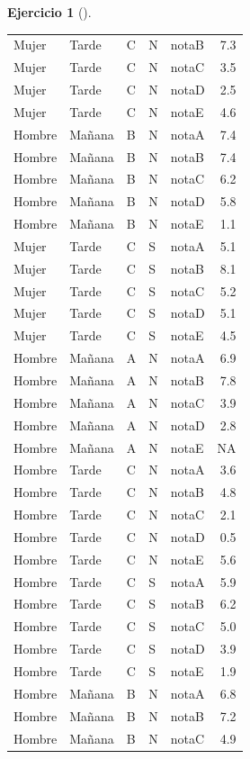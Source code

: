 \documentclass[
  a4paper,
]{scrreport}
\theoremstyle{definition}
\newtheorem{exercise}{Ejercicio}[chapter]
\theoremstyle{remark}
\begin{document}
\begin{exercise}[]
\begin{enumerate}
\begin{tcolorbox}
\begin{longtable}[]{@{}lllllr@{}}
  Mujer & Tarde & C & N & notaB & 7.3 \\
  Mujer & Tarde & C & N & notaC & 3.5 \\
  Mujer & Tarde & C & N & notaD & 2.5 \\
  Mujer & Tarde & C & N & notaE & 4.6 \\
  Hombre & Mañana & B & N & notaA & 7.4 \\
  Hombre & Mañana & B & N & notaB & 7.4 \\
  Hombre & Mañana & B & N & notaC & 6.2 \\
  Hombre & Mañana & B & N & notaD & 5.8 \\
  Hombre & Mañana & B & N & notaE & 1.1 \\
  Mujer & Tarde & C & S & notaA & 5.1 \\
  Mujer & Tarde & C & S & notaB & 8.1 \\
  Mujer & Tarde & C & S & notaC & 5.2 \\
  Mujer & Tarde & C & S & notaD & 5.1 \\
  Mujer & Tarde & C & S & notaE & 4.5 \\
  Hombre & Mañana & A & N & notaA & 6.9 \\
  Hombre & Mañana & A & N & notaB & 7.8 \\
  Hombre & Mañana & A & N & notaC & 3.9 \\
  Hombre & Mañana & A & N & notaD & 2.8 \\
  Hombre & Mañana & A & N & notaE & NA \\
  Hombre & Tarde & C & N & notaA & 3.6 \\
  Hombre & Tarde & C & N & notaB & 4.8 \\
  Hombre & Tarde & C & N & notaC & 2.1 \\
  Hombre & Tarde & C & N & notaD & 0.5 \\
  Hombre & Tarde & C & N & notaE & 5.6 \\
  Hombre & Tarde & C & S & notaA & 5.9 \\
  Hombre & Tarde & C & S & notaB & 6.2 \\
  Hombre & Tarde & C & S & notaC & 5.0 \\
  Hombre & Tarde & C & S & notaD & 3.9 \\
  Hombre & Tarde & C & S & notaE & 1.9 \\
  Hombre & Mañana & B & N & notaA & 6.8 \\
  Hombre & Mañana & B & N & notaB & 7.2 \\
  Hombre & Mañana & B & N & notaC & 4.9 \\

\end{longtable}
\end{tcolorbox}
\end{enumerate}
\end{exercise}
\end{document}
